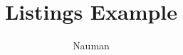 \documentclass{article}
\begin{document}
\title{Listings Example}
\author{Nauman} 
\maketitle 




\end{document}
